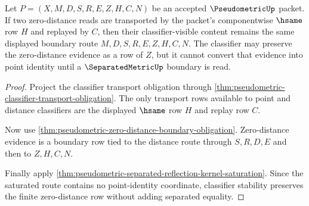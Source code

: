 \begin{theorem}
\label{thm:pseudometric-zero-distance-classifier-stability}
Let $P=(X,M,D,S,R,E,Z,H,C,N)$ be an accepted $\PseudometricUp$ packet. If two zero-distance reads are transported by the packet's componentwise $\hsame$ row $H$ and replayed by $C$, then their classifier-visible content remains the same displayed boundary route $M,D,S,R,E,Z,H,C,N$. The classifier may preserve the zero-distance evidence as a row of $Z$, but it cannot convert that evidence into point identity until a $\SeparatedMetricUp$ boundary is read.
\end{theorem}
\begin{proof}
Project the classifier transport obligation through \autoref{thm:pseudometric-classifier-transport-obligation}. The only transport rows available to point and distance classifiers are the displayed $\hsame$ row $H$ and replay row $C$.

Now use \autoref{thm:pseudometric-zero-distance-boundary-obligation}. Zero-distance evidence is a boundary row tied to the distance route through $S,R,D,E$ and then to $Z,H,C,N$.

Finally apply \autoref{thm:pseudometric-separated-reflection-kernel-saturation}. Since the saturated route contains no point-identity coordinate, classifier stability preserves the finite zero-distance row without adding separated equality.
\end{proof}

